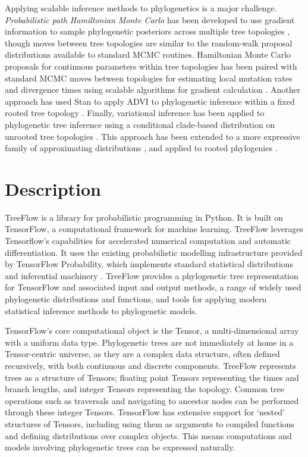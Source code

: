 Applying scalable inference methods to phylogenetics is a major challenge. \textit{Probabilistic path Hamiltonian Monte Carlo} has been developed to use gradient information to sample phylogenetic posteriors across multiple tree topologies \cite{dinh2017probabilistic}, though moves between tree topologies are similar to the random-walk proposal distributions available to standard MCMC routines. Hamiltonian Monte Carlo proposals for continuous parameters within tree topologies has been paired with standard MCMC moves between topologies for estimating local mutation rates and divergence times using scalable algorithms for gradient calculation \cite{ji2021scalable, fisher2021shrinkage}. Another approach has used Stan to apply ADVI to phylogenetic inference within a fixed rooted tree topology \cite{fourment2019evaluating}. Finally, variational inference has been applied to phylogenetic tree inference using a conditional clade-based distribution on unrooted tree topologies \cite{zhang2018variational}. This approach has been extended to a more expressive family of approximating distributions \cite{zhang2020improved}, and applied to rooted phylogenies \cite{zhang2022variational}.

\section{Description}

TreeFlow is a library for probabilistic programming in Python. It is built on TensorFlow, a computational framework for machine learning. TreeFlow leverages Tensorflow's capabilities for accelerated numerical computation and automatic differentiation. It uses the existing probabilistic modelling infrastructure provided by TensorFlow Probability, which implements standard statistical distributions and inferential machinery \cite{dillon2017tensorflow}. TreeFlow provides a phylogenetic tree representation for TensorFlow and associated input and output methods, a range of widely used phylogenetic distributions and functions, and tools for applying modern statistical inference methods to phylogenetic models.

TensorFlow's core computational object is the Tensor, a multi-dimensional array with a uniform data type. Phylogenetic trees are not immediately at home in a Tensor-centric universe, as they are a complex data structure, often defined recursively, with both continuous and discrete components. TreeFlow represents trees as a structure of Tensors; floating point Tensors representing the times and branch lengths, and integer Tensors representing the topology. Common tree operations such as traversals and navigating to ancestor nodes can be performed through these integer Tensors. TensorFlow has extensive support for `nested' structures of Tensors, including using them as arguments to compiled functions and defining distributions over complex objects. This means computations and models involving phylogenetic trees can be expressed naturally.

